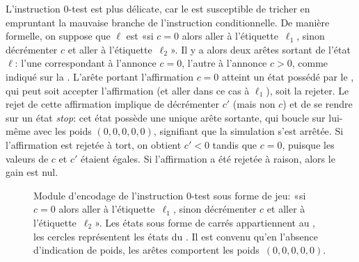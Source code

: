 L'instruction $0$-test est plus délicate, car le \jo est susceptible de tricher en empruntant la mauvaise branche de l'instruction conditionnelle.
De manière formelle, on suppose que $\ell$ est «si $c=0$ alors aller à l'étiquette~$\ell_1$, sinon décrémenter $c$ et aller à l'étiquette~$\ell_2$».
Il y a alors deux arêtes sortant de l'état $\ell$: l'une correspondant à l'annonce $c=0$, l'autre à l'annonce $c>0$, comme indiqué sur la .
L'arête portant l'affirmation $c=0$ atteint un état possédé par le \ji, qui peut soit accepter l'affirmation (et aller dans ce cas à $\ell_1$), soit la rejeter.
Le rejet de cette affirmation implique de décrémenter $c'$ (mais non $c$) et de se rendre sur un état \emph{stop}: cet état possède une unique arête sortante, qui boucle sur lui-même avec les poids $(0,0,0,0,0)$, signifiant que la simulation s'est arrêtée.
Si l'affirmation est rejetée à tort, on obtient $c'<0$ tandis que $c=0$, puisque les valeurs de $c$ et $c'$ étaient égales.
Si l'affirmation a été rejetée à raison, alors le gain est nul.

\begin{figure}[ht]
\centering
{}
\caption[Module d'encodage de l'instruction $0$-test sous forme de jeu.]{Module d'encodage de l'instruction $0$-test sous forme de jeu: «si $c=0$ alors aller à l'étiquette~$\ell_1$, sinon décrémenter $c$ et aller à l'étiquette~$\ell_2$». Les états sous forme de carrés appartiennent au \jo, les cercles représentent les états du \ji. Il est convenu qu'en l'absence d'indication de poids, les arêtes comportent les poids~$(0,0,0,0,0)$.}%
\label{tj:fig:zerotest}
\end{figure}

